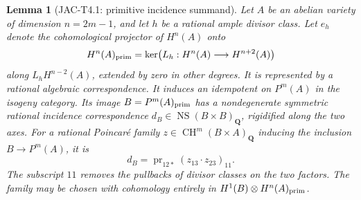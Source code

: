\documentclass[11pt,a4paper]{article}
\newtheorem{lemma}[theorem]{Lemma}
\begin{document}
\begin{lemma}[JAC-T4.1: primitive incidence summand]
\label{lem:primitive-summand}
Let $A$ be an abelian variety of dimension $n=2m-1$, and let $h$ be a
rational ample divisor class. Let $e_h$ denote the cohomological projector
of $H^n(A)$ onto
\[
 H^n(A)_{\rm prim}=\ker\bigl(L_h:H^n(A)\longrightarrow H^{n+2}(A)\bigr)
\]
along $L_hH^{n-2}(A)$, extended by zero in other degrees.
It is represented by a rational algebraic correspondence. It induces an
idempotent on $P^m(A)$ in the isogeny category. Its image $B=P^m(A)_{\rm prim}$
has a nondegenerate symmetric rational incidence correspondence
$d_B\in\operatorname{NS}(B\times B)_{\mathbf Q}$, rigidified along the two
axes. For a rational Poincar\'e family $z\in\operatorname{CH}^m(B\times A)_{\mathbf Q}$
inducing the inclusion $B\longrightarrow P^m(A)$, it is
\begin{equation}\label{eq:incidence}
 d_B=\operatorname{pr}_{12*}(z_{13}\cdot z_{23})_{11}.
\end{equation}
The subscript $11$ removes the pullbacks of divisor classes on the two
factors. The family may be chosen with cohomology entirely in
$H^1(B)\otimes H^n(A)_{\rm prim}$.
\end{lemma}
\end{document}
